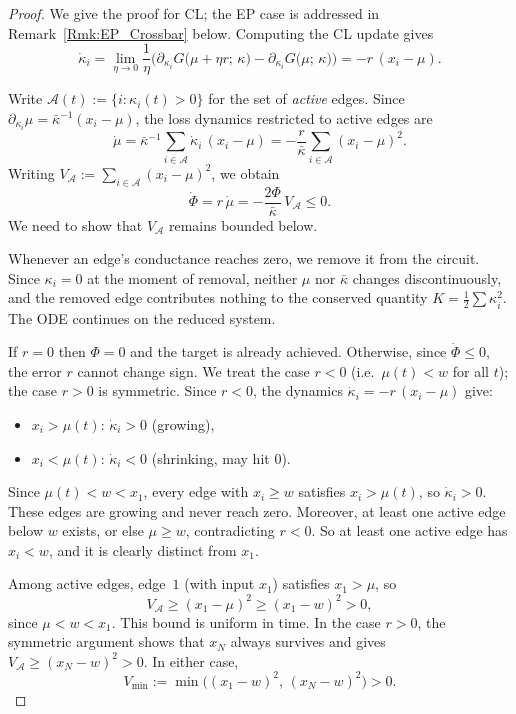 \documentclass[10pt,a4paper]{amsart}
\begin{document}
  \begin{proof}

  We give the proof for CL; the EP case is addressed in Remark~\ref{Rmk:EP_Crossbar} below. Computing the CL update gives
\[
\dot{\kappa}_i
= \lim_{\eta \to 0}
  \dfrac{1}{\eta}\Big(\partial_{\kappa_i}G\big(\mu + \eta r;\, \kappa\big)
  - \partial_{\kappa_i}G\big(\mu;\, \kappa\big)\Big)
= -r\,(x_i - \mu).
\]

Write $\mathcal{A}(t) := \{i : \kappa_i(t) > 0\}$ for the set of
\emph{active} edges.  Since
$\partial_{\kappa_i}\mu = \bar{\kappa}^{-1}(x_i - \mu)$, the loss dynamics
restricted to active edges are
\[
\dot{\mu}
= \bar{\kappa}^{-1}\sum_{i \in \mathcal{A}} \dot{\kappa}_i\,(x_i - \mu)
= -\dfrac{r}{\bar{\kappa}} \sum_{i \in \mathcal{A}} (x_i - \mu)^2.
\]
Writing $V_{\mathcal{A}} := \sum_{i \in \mathcal{A}} (x_i - \mu)^2$, we obtain
\begin{equation}\label{eq:crossbar_loss}
\dot{\Phi} = r\,\dot{\mu} = -\dfrac{2\Phi}{\bar{\kappa}}\, V_{\mathcal{A}}
\leq 0.
\end{equation}
We need to show that $V_{\mathcal{A}}$ remains bounded below.

Whenever an edge's conductance reaches zero, we remove it from the circuit.
Since $\kappa_i = 0$ at the moment of removal, neither $\mu$ nor $\bar{\kappa}$
changes discontinuously, and the removed edge contributes nothing to the
conserved quantity $K = \frac{1}{2}\sum \kappa_i^2$.
The ODE continues on the reduced system.

If $r = 0$ then $\Phi = 0$ and the target is already achieved.
Otherwise, since $\dot{\Phi} \leq 0$, the error $r$ cannot change sign.
We treat the case $r < 0$ (i.e.\ $\mu(t) < w$ for all $t$);
the case $r > 0$ is symmetric. Since $r < 0$, the dynamics $\dot{\kappa}_i = -r\,(x_i - \mu)$ give:
\begin{itemize}
\item $x_i > \mu(t)$:\; $\dot{\kappa}_i > 0$ (growing),
\item $x_i < \mu(t)$:\; $\dot{\kappa}_i < 0$ (shrinking, may hit $0$).
\end{itemize}

Since $\mu(t) < w < x_1$, every edge with $x_i \geq w$ satisfies
$x_i > \mu(t)$, so $\dot{\kappa}_i > 0$.
These edges are growing and never reach zero. Moreover, at least one active edge below $w$ exists, or else $\mu \geq w$, contradicting $r < 0$.
So at least one active edge has $x_i < w$, and it is clearly distinct
from $x_1$.

Among active edges, edge~$1$ (with input $x_1$) satisfies $x_1 > \mu$, so
\[
V_{\mathcal{A}} \geq (x_1 - \mu)^2 \geq (x_1 - w)^2 > 0,
\]
since $\mu < w < x_1$.  This bound is uniform in time.
In the case $r > 0$, the symmetric argument shows that $x_N$ always
survives and gives $V_{\mathcal{A}} \geq (x_N - w)^2 > 0$.  In either case,
\[
V_{\min} := \min\!\big((x_1 - w)^2,\, (x_N - w)^2\big) > 0.
\]


\end{proof}
\end{document}
